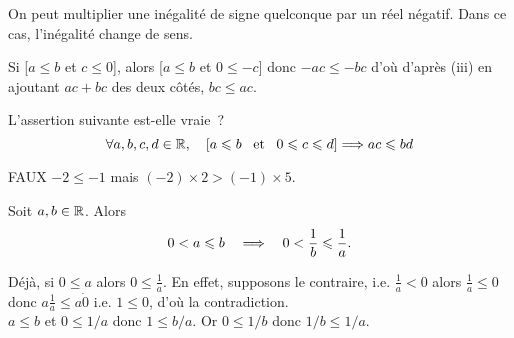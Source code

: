 \documentclass{magnolia}
\begin{document}
\begin{remarqueUnique}
\remarque On peut multiplier une inégalité de signe quelconque par un réel
  négatif. Dans ce cas, l'inégalité change de sens.
\begin{sol}
Si [$a\leq b$ et $c\leq 0$], alors [$a\leq b$ et $0\leq -c$] donc $-ac\leq -bc$ d'où d'après (iii) en ajoutant $ac+bc$ des deux côtés, $bc\leq ac$.
\end{sol}  
  
\end{remarqueUnique}

\begin{exoUnique}
\exo L'assertion suivante est-elle vraie~?
  \[\forall a,b,c,d\in\mathbb{R} ,\quad\left[a\leqslant b \quad\!\text{et}\quad\! 0\leqslant c\leqslant d\right]\Longrightarrow
    ac\leqslant bd\]
\end{exoUnique}
\begin{sol}
FAUX $-2\leq -1$ mais $(-2)\times 2 > (-1)\times 5$.
\end{sol}

\begin{proposition}
Soit $a,b\in\mathbb{R}$. Alors
\[0<a\leqslant b \quad\Longrightarrow\quad 0<\frac{1}{b}\leqslant\frac{1}{a}.\]
\end{proposition}

\begin{preuve}
Déjà, si $0\leq a$ alors $0\leq \frac{1}{a}$. En effet, supposons le contraire, i.e. $\frac{1}{a}<0$ alors $\frac{1}{a}\leq 0$ donc $a\frac{1}{a}\leq a\dot 0$ i.e. $1\leq 0$, d'où la contradiction.\\

$a\leq b$ et $0\leq 1/a$ donc $1\leq b/a$. Or $0\leq 1/b$ donc $1/b\leq 1/a$.

\end{preuve}
\end{document}
